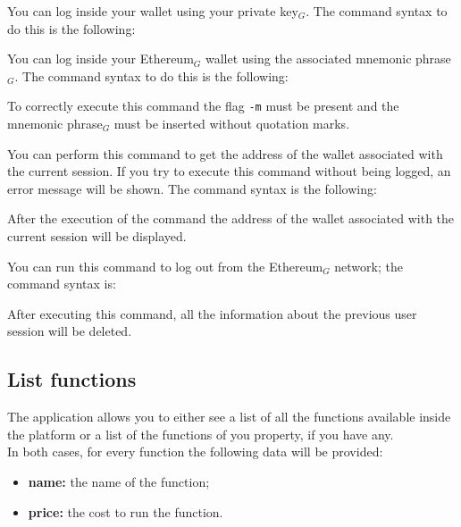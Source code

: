 You can log inside your wallet using your private key$_{G}$. The command syntax to do this is the following:
\begin{center}
\end{center}

You can log inside your Ethereum$_{G}$ wallet using the associated mnemonic phrase$_{G}$. The command syntax to do this is the following:
\begin{center}
\end{center}
To correctly execute this command the flag \texttt{-m} must be present and the mnemonic phrase$_{G}$ must be inserted without quotation marks.

You can perform this command to get the address of the wallet associated with the current session. If you try to execute this command without being logged, an error message will be shown. The command syntax is the following: 
\begin{center}
\end{center}
After the execution of the command the address of the wallet associated with the current session will be displayed.

You can run this command to log out from the Ethereum$_{G}$ network; the command syntax is:
\begin{center}
\end{center}
After executing this command, all the information about the previous user session will be deleted.

\subsection{List functions}
The application allows you to either see a list of all the functions available inside the platform or a list of the functions of you property, if you have any. \\
\noindent In both cases, for every function the following data will be provided:
\begin{itemize}
	\item \textbf{name: } the name of the function;
	\item \textbf{price: } the cost to run the function.
\end{itemize}

